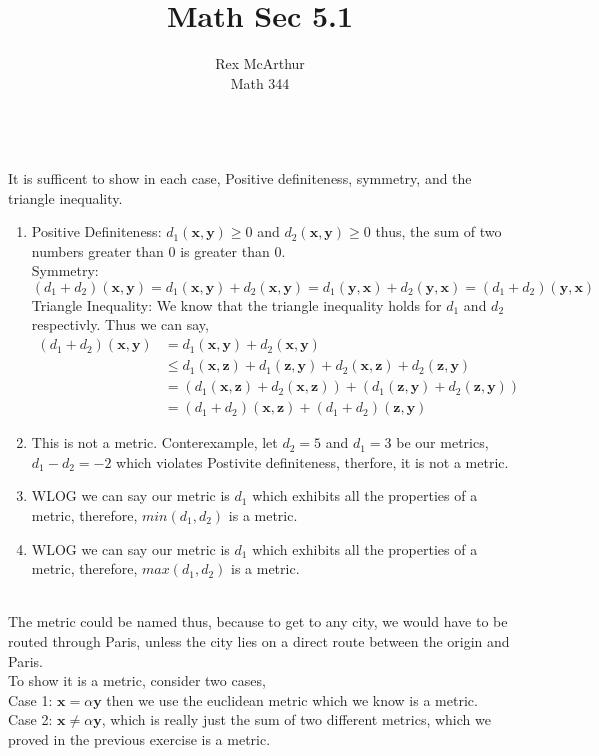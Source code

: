 \documentclass[letterpaper,12pt]{article}
\title{Math Sec 5.1}
\author{Rex McArthur\\Math 344}
\theoremstyle{definition}
\begin{document}
\maketitle
{}\\
It is sufficent to show in each case, Positive definiteness, symmetry, and the triangle inequality.
\begin{enumerate}
    \item Positive Definiteness: $d_1(\textbf{x}, \textbf{y}) \geq 0$ and $d_2(\textbf{x}, \textbf{y}) \geq 0$ thus, the sum of two numbers greater than 0 is greater than 0.
\\
Symmetry: $(d_1+d_2)(\textbf{x}, \textbf{y}) = d_1(\textbf{x}, \textbf{y}) + d_2(\textbf{x}, \textbf{y}) = d_1(\textbf{y}, \textbf{x}) + d_2(\textbf{y}, \textbf{x}) = (d_1+d_2)(\textbf{y}, \textbf{x})$\\
Triangle Inequality: We know that the triangle inequality holds for $d_1$ and $d_2$ respectivly. Thus we can say,
\begin{align*}
    (d_1 + d_2)(\textbf{x}, \textbf{y}) &= d_1(\textbf{x}, \textbf{y}) + d_2(\textbf{x}, \textbf{y}) \\
    & \leq d_1(\textbf{x}, \textbf{z}) + d_1(\textbf{z}, \textbf{y}) + d_2(\textbf{x}, \textbf{z}) + d_2(\textbf{z}, \textbf{y}) \\
    &= (d_1(\textbf{x}, \textbf{z}) + d_2(\textbf{x}, \textbf{z})) + (d_1(\textbf{z}, \textbf{y}) + d_2(\textbf{z}, \textbf{y})) \\
    &= (d_1 + d_2)(\textbf{x}, \textbf{z}) + (d_1 + d_2)(\textbf{z}, \textbf{y}) 
\end{align*}
    \item This is not a metric. Conterexample, let $d_2 = 5$ and $d_1 = 3$ be our metrics, $d_1 - d_2 = -2$ which violates Postivite definiteness, therfore, it is not a metric.
    \item WLOG we can say our metric is $d_1$ which exhibits all the properties of a metric, therefore, $min(d_1, d_2)$ is a metric.
    \item WLOG we can say our metric is $d_1$ which exhibits all the properties of a metric, therefore, $max(d_1, d_2)$ is a metric.
\end{enumerate}

\\
The metric could be named thus, because to get to any city, we would have to be routed through Paris, unless the city lies on a direct route between the origin and Paris.\\
To show it is a metric, consider two cases, \\
Case 1: $\textbf{x}=\alpha \textbf{y}$ then we use the euclidean metric which we know is a  metric.\\
Case 2: $\textbf{x} \neq \alpha \textbf{y}$, which is really just the sum of two different metrics, which we proved in the previous exercise is a metric. 
\end{document}
